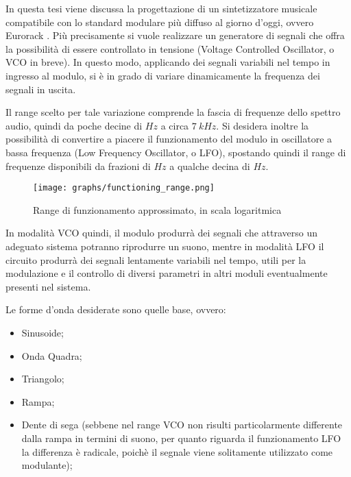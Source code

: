 \label{introduzione}


In questa tesi viene discussa la progettazione di un sintetizzatore musicale compatibile con
lo standard modulare più diffuso al giorno d'oggi, ovvero Eurorack \cite{eurorack}. Più
precisamente si vuole realizzare un generatore di segnali che offra la possibilità di essere
controllato in tensione (Voltage Controlled Oscillator, o VCO in breve). In questo modo,
applicando dei segnali variabili nel tempo in ingresso al modulo, si è in grado di variare
dinamicamente la frequenza dei segnali in uscita.

Il range scelto per tale variazione comprende la fascia di frequenze dello spettro audio,
quindi da poche decine di $Hz$ a circa $7\ kHz$. Si desidera inoltre la possibilità di
convertire a piacere il funzionamento del modulo in oscillatore a bassa frequenza (Low Frequency
Oscillator, o LFO), spostando quindi il range di frequenze disponibili da frazioni di
$Hz$ a qualche decina di $Hz$.
\medskip

\begin{figure}[H]
    \centering
    \texttt{[image: graphs/functioning\_range.png]}
    \caption{Range di funzionamento approssimato, in scala logaritmica}
    \label{functioning_range}
\end{figure}

In modalità VCO quindi, il modulo produrrà dei segnali che attraverso un adeguato sistema
potranno riprodurre un suono, mentre in modalità LFO il circuito produrrà dei segnali
lentamente variabili nel tempo, utili per la modulazione e il controllo di diversi
parametri in altri moduli eventualmente presenti nel sistema.

Le forme d'onda desiderate sono quelle base, ovvero:

\begin{itemize}
    \item Sinusoide;
    \item Onda Quadra;
    \item Triangolo;
    \item Rampa;
    \item Dente di sega (sebbene nel range VCO non risulti particolarmente differente dalla
          rampa in termini di suono, per quanto riguarda il funzionamento LFO la differenza
          è radicale, poichè il segnale viene solitamente utilizzato come modulante);
\end{itemize}

